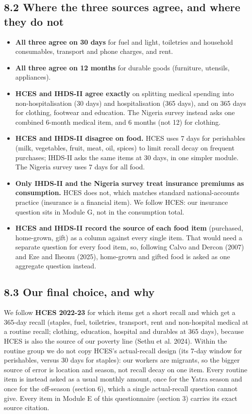 \documentclass[10pt]{article}
\begin{document}
\subsection*{8.2 Where the three sources agree, and where they do not}
\begin{itemize}[leftmargin=1.2em,itemsep=2pt]
\item \textbf{All three agree on 30 days} for fuel and light, toiletries and household consumables, transport and phone charges, and rent.
\item \textbf{All three agree on 12 months} for durable goods (furniture, utensils, appliances).
\item \textbf{HCES and IHDS-II agree exactly} on splitting medical spending into non-hospitalisation (30 days) and hospitalisation (365 days), and on 365 days for clothing, footwear and education. The Nigeria survey instead asks one combined 6-month medical item, and 6 months (not 12) for clothing.
\item \textbf{HCES and IHDS-II disagree on food.} HCES uses 7 days for perishables (milk, vegetables, fruit, meat, oil, spices) to limit recall decay on frequent purchases; IHDS-II asks the same items at 30 days, in one simpler module. The Nigeria survey uses 7 days for all food.
\item \textbf{Only IHDS-II and the Nigeria survey treat insurance premiums as consumption.} HCES does not, which matches standard national-accounts practice (insurance is a financial item). We follow HCES: our insurance question sits in Module G, not in the consumption total.
\item \textbf{HCES and IHDS-II record the source of each food item} (purchased, home-grown, gift) as a column against every single item. That would need a separate question for every food item, so, following Calvo and Dercon (2007) and Eze and Iheonu (2025), home-grown and gifted food is asked as one aggregate question instead.
\end{itemize}
\subsection*{8.3 Our final choice, and why}
We follow \textbf{HCES 2022-23} for which items get a short recall and which get a 365-day recall (staples, fuel, toiletries, transport, rent and non-hospital medical at a routine recall; clothing, education, hospital and durables at 365 days), because HCES is also the source of our poverty line (Sethu et al. 2024). Within the routine group we do not copy HCES's actual-recall design (its 7-day window for perishables, versus 30 days for staples): our workers are migrants, so the bigger source of error is location and season, not recall decay on one item. Every routine item is instead asked as a usual monthly amount, once for the Yatra season and once for the off-season (section 6), which a single actual-recall question cannot give. Every item in Module E of this questionnaire (section 3) carries its exact source citation.
\end{document}
